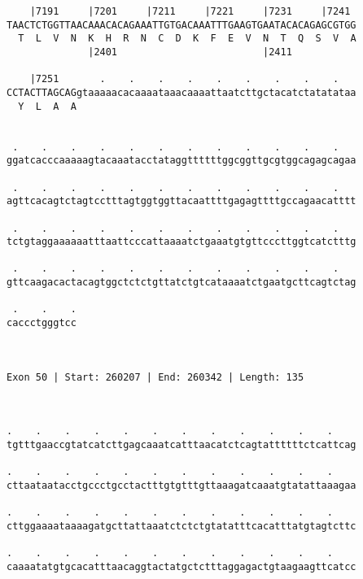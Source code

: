 \documentclass{article}
\begin{document}
\begin{Verbatim}
    |7191     |7201     |7211     |7221     |7231     |7241 
TAACTCTGGTTAACAAACACAGAAATTGTGACAAATTTGAAGTGAATACACAGAGCGTGG
  T  L  V  N  K  H  R  N  C  D  K  F  E  V  N  T  Q  S  V  A
              |2401                         |2411           
  
    |7251       .    .    .    .    .    .    .    .    .   
CCTACTTAGCAGgtaaaaacacaaaataaacaaaattaatcttgctacatctatatataa
  Y  L  A  A                                                
                                                            
  
 .    .    .    .    .    .    .    .    .    .    .    .   
ggatcacccaaaaagtacaaatacctataggttttttggcggttgcgtggcagagcagaa
                                                            
 .    .    .    .    .    .    .    .    .    .    .    .   
agttcacagtctagtcctttagtggtggttacaattttgagagttttgccagaacatttt
                                                            
 .    .    .    .    .    .    .    .    .    .    .    .   
tctgtaggaaaaaatttaattcccattaaaatctgaaatgtgttcccttggtcatctttg
                                                            
 .    .    .    .    .    .    .    .    .    .    .    .   
gttcaagacactacagtggctctctgttatctgtcataaaatctgaatgcttcagtctag
                                                            
 .    .    .
caccctgggtcc
            
            
 
Exon 50 | Start: 260207 | End: 260342 | Length: 135



.    .    .    .    .    .    .    .    .    .    .    .    
tgtttgaaccgtatcatcttgagcaaatcatttaacatctcagtattttttctcattcag
                                                            
.    .    .    .    .    .    .    .    .    .    .    .    
cttaataatacctgccctgcctactttgtgtttgttaaagatcaaatgtatattaaagaa
                                                            
.    .    .    .    .    .    .    .    .    .    .    .    
cttggaaaataaaagatgcttattaaatctctctgtatatttcacatttatgtagtcttc
                                                            
.    .    .    .    .    .    .    .    .    .    .    .    
caaaatatgtgcacatttaacaggtactatgctctttaggagactgtaagaagttcatcc
                                                            

\end{Verbatim}
\end{document}
